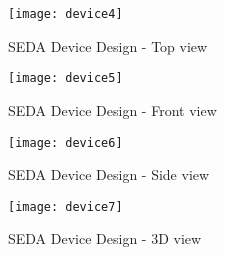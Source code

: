 

\begin{figure}
\caption{SEDA Device Design - Top view}
\centering
\texttt{[image: device4]}
\end{figure}

\newpage

\begin{figure}
\caption{SEDA Device Design - Front view}
\centering
\texttt{[image: device5]}
\end{figure}

\newpage

\begin{figure}
\caption{SEDA Device Design - Side view}
\centering
\texttt{[image: device6]}
\end{figure}

\newpage

\begin{figure}
\caption{SEDA Device Design - 3D view}
\centering
\texttt{[image: device7]}
\end{figure}